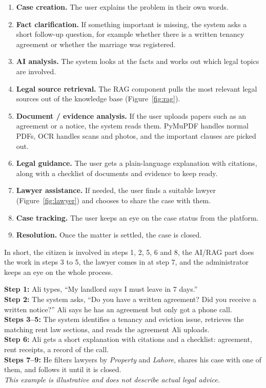 \documentclass[12pt,a4paper]{report}
\begin{document}
\begin{enumerate}
  \item \textbf{Case creation.} The user explains the problem in their own words.
  \item \textbf{Fact clarification.} If something important is missing, the system asks a short follow-up question, for example whether there is a written tenancy agreement or whether the marriage was registered.
  \item \textbf{AI analysis.} The system looks at the facts and works out which legal topics are involved.
  \item \textbf{Legal source retrieval.} The RAG component pulls the most relevant legal sources out of the knowledge base (Figure~\ref{fig:rag}).
  \item \textbf{Document / evidence analysis.} If the user uploads papers such as an agreement or a notice, the system reads them. PyMuPDF handles normal PDFs, OCR handles scans and photos, and the important clauses are picked out.
  \item \textbf{Legal guidance.} The user gets a plain-language explanation with citations, along with a checklist of documents and evidence to keep ready.
  \item \textbf{Lawyer assistance.} If needed, the user finds a suitable lawyer (Figure~\ref{fig:lawyer}) and chooses to share the case with them.
  \item \textbf{Case tracking.} The user keeps an eye on the case status from the platform.
  \item \textbf{Resolution.} Once the matter is settled, the case is closed.
\end{enumerate}
In short, the citizen is involved in steps 1, 2, 5, 6 and 8, the AI/RAG part does the work in steps 3 to 5, the lawyer comes in at step 7, and the administrator keeps an eye on the whole process.

\begin{example}
\textbf{Step 1:} Ali types, ``My landlord says I must leave in 7 days.''\\
\textbf{Step 2:} The system asks, ``Do you have a written agreement? Did you receive a written notice?'' Ali says he has an agreement but only got a phone call.\\
\textbf{Steps 3--5:} The system identifies a tenancy and eviction issue, retrieves the matching rent law sections, and reads the agreement Ali uploads.\\
\textbf{Step 6:} Ali gets a short explanation with citations and a checklist: agreement, rent receipts, a record of the call.\\
\textbf{Steps 7--9:} He filters lawyers by \emph{Property} and \emph{Lahore}, shares his case with one of them, and follows it until it is closed.\\[2pt]
{\small\itshape This example is illustrative and does not describe actual legal advice.}
\end{example}
\end{document}
